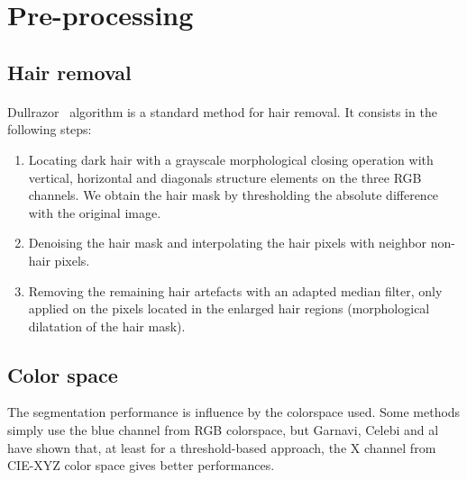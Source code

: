 \documentclass[a4paper,10pt]{article}
\begin{document}
\section{Pre-processing}
\subsection{Hair removal}
\paragraph{} Dullrazor~\cite{Dullrazor1997} algorithm is a standard method for 
hair removal. It consists in the following steps:
\begin{enumerate}
 \item Locating dark hair with a grayscale morphological closing operation with 
vertical, horizontal and diagonals structure elements on the three RGB channels. 
We obtain the hair mask by thresholding the absolute difference with the 
original image.
 \item Denoising the hair mask and interpolating the hair pixels with neighbor 
non-hair pixels. 
 \item Removing the remaining hair artefacts with an adapted median filter, only 
applied on the pixels located in the enlarged hair regions
 (morphological dilatation of the hair mask).
\end{enumerate}


\subsection{Color space}
The segmentation performance is influence by the colorspace used. Some methods 
 simply use the blue channel from RGB colorspace, but 
Garnavi, Celebi and al~\cite{Garnavi2010} have shown that, at least for a 
threshold-based approach, the X channel from CIE-XYZ color space gives better 
performances.
\end{document}
